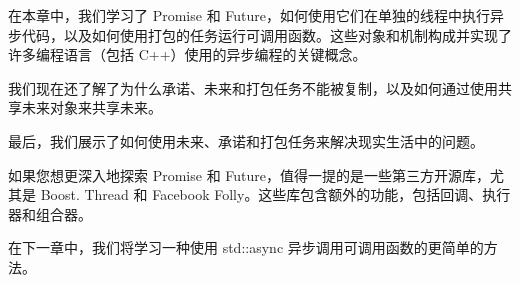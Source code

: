 在本章中，我们学习了 Promise 和 Future，如何使用它们在单独的线程中执行异步代码，以及如何使用打包的任务运行可调用函数。这些对象和机制构成并实现了许多编程语言（包括 C++）使用的异步编程的关键概念。

我们现在还了解了为什么承诺、未来和打包任务不能被复制，以及如何通过使用共享未来对象来共享未来。

最后，我们展示了如何使用未来、承诺和打包任务来解决现实生活中的问题。

如果您想更深入地探索 Promise 和 Future，值得一提的是一些第三方开源库，尤其是 Boost.
Thread 和 Facebook Folly。这些库包含额外的功能，包括回调、执行器和组合器。

在下一章中，我们将学习一种使用 std::async 异步调用可调用函数的更简单的方法。


